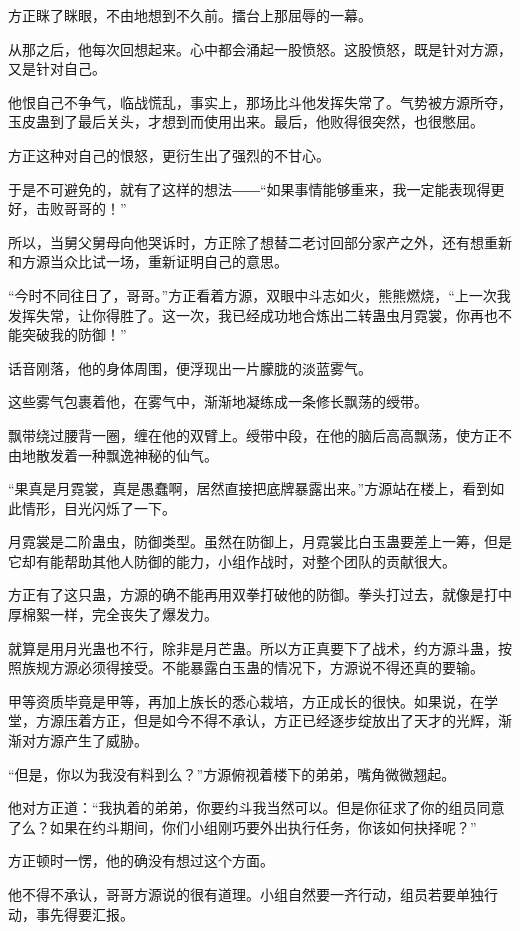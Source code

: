\begin{this_body}
方正眯了眯眼，不由地想到不久前。擂台上那屈辱的一幕。

从那之后，他每次回想起来。心中都会涌起一股愤怒。这股愤怒，既是针对方源，又是针对自己。

他恨自己不争气，临战慌乱，事实上，那场比斗他发挥失常了。气势被方源所夺，玉皮蛊到了最后关头，才想到而使用出来。最后，他败得很突然，也很憋屈。

方正这种对自己的恨怒，更衍生出了强烈的不甘心。

于是不可避免的，就有了这样的想法――“如果事情能够重来，我一定能表现得更好，击败哥哥的！”

所以，当舅父舅母向他哭诉时，方正除了想替二老讨回部分家产之外，还有想重新和方源当众比试一场，重新证明自己的意思。

“今时不同往日了，哥哥。”方正看着方源，双眼中斗志如火，熊熊燃烧，“上一次我发挥失常，让你得胜了。这一次，我已经成功地合炼出二转蛊虫月霓裳，你再也不能突破我的防御！”

话音刚落，他的身体周围，便浮现出一片朦胧的淡蓝雾气。

这些雾气包裹着他，在雾气中，渐渐地凝练成一条修长飘荡的绶带。

飘带绕过腰背一圈，缠在他的双臂上。绶带中段，在他的脑后高高飘荡，使方正不由地散发着一种飘逸神秘的仙气。

“果真是月霓裳，真是愚蠢啊，居然直接把底牌暴露出来。”方源站在楼上，看到如此情形，目光闪烁了一下。

月霓裳是二阶蛊虫，防御类型。虽然在防御上，月霓裳比白玉蛊要差上一筹，但是它却有能帮助其他人防御的能力，小组作战时，对整个团队的贡献很大。

方正有了这只蛊，方源的确不能再用双拳打破他的防御。拳头打过去，就像是打中厚棉絮一样，完全丧失了爆发力。

就算是用月光蛊也不行，除非是月芒蛊。所以方正真要下了战术，约方源斗蛊，按照族规方源必须得接受。不能暴露白玉蛊的情况下，方源说不得还真的要输。

甲等资质毕竟是甲等，再加上族长的悉心栽培，方正成长的很快。如果说，在学堂，方源压着方正，但是如今不得不承认，方正已经逐步绽放出了天才的光辉，渐渐对方源产生了威胁。

“但是，你以为我没有料到么？”方源俯视着楼下的弟弟，嘴角微微翘起。

他对方正道：“我执着的弟弟，你要约斗我当然可以。但是你征求了你的组员同意了么？如果在约斗期间，你们小组刚巧要外出执行任务，你该如何抉择呢？”

方正顿时一愣，他的确没有想过这个方面。

他不得不承认，哥哥方源说的很有道理。小组自然要一齐行动，组员若要单独行动，事先得要汇报。


\end{this_body}
